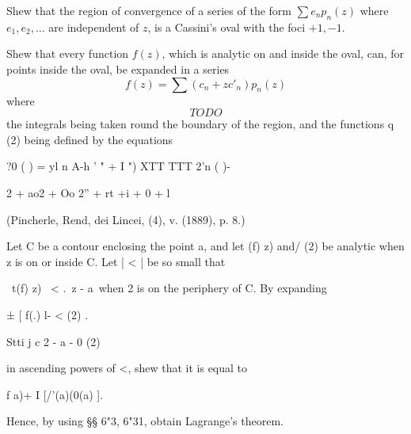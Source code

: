 \begin{wandwmiscexamples}
\begin{wandwmiscexample}
    Shew that the region of convergence of a series of the form
    $\sum e_{n} p_{n}(z)$ where
    $e_{1}, e_{2}, \ldots$ are independent of $z$, is a Cassini's oval
    with the foci $+1, -1$.

    Shew that every function $f(z)$, which is analytic on and inside the
    oval, can, for points inside the oval, be expanded in a series
    $$
    f(z) = \sum (c_{n} + z c'_{n}) p_{n}(z) %
    $$
    where
    $$
    TODO
    $$
    the integrals being taken round the boundary of the region, and the
    functions q (2) being defined by the equations

    ?0 ( ) = yl n A-h ' " + I ") XTT TTT 2'n ( )-

    2 + ao2 + Oo 2'' + rt +i + 0 + l

    (Pincherle, Rend, dei Lincei, (4), v. (1889), p. 8.)
  \end{wandwmiscexample}
  \begin{wandwmiscexample}
    Let C be a contour enclosing the point a, and let (f) z) and/
    (2) be analytic when z is on or inside C. Let | < | be so small that

    \ t(f) z) \ < .\ z - a\ when 2 is on the periphery of C. By expanding

    ± [ f(.) l- < (2) .

    Stti j c 2 - a - 0 (2)

    in ascending powers of <, shew that it is equal to

    f a)+ I [/'(a)(0(a) ].

    Hence, by using §§ 6"3, 6"31, obtain Lagrange's theorem.
  \end{wandwmiscexample}
\end{wandwmiscexamples}